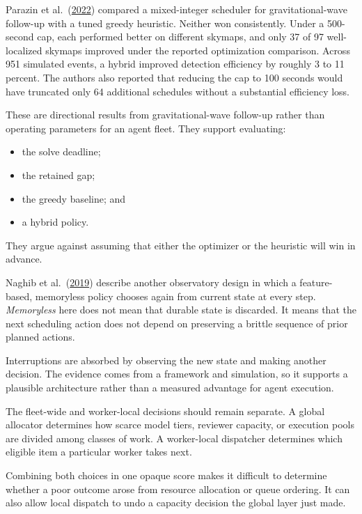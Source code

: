 Parazin et al.~(\href{https://arxiv.org/abs/2203.00013}{2022}) compared a mixed-integer scheduler for gravitational-wave follow-up with a tuned greedy heuristic. Neither won consistently. Under a 500-second cap, each performed better on different skymaps, and only 37 of 97 well-localized skymaps improved under the reported optimization comparison. Across 951 simulated events, a hybrid improved detection efficiency by roughly 3 to 11 percent. The authors also reported that reducing the cap to 100 seconds would have truncated only 64 additional schedules without a substantial efficiency loss.


These are directional results from gravitational-wave follow-up rather than operating parameters for an agent fleet. They support evaluating:

\begin{itemize}
\tightlist
\item
  the solve deadline;
\item
  the retained gap;
\item
  the greedy baseline; and
\item
  a hybrid policy.
\end{itemize}

They argue against assuming that either the optimizer or the heuristic will win in advance.

Naghib et al.~(\href{https://arxiv.org/abs/1810.04815}{2019}) describe another observatory design in which a feature-based, memoryless policy chooses again from current state at every step. \emph{Memoryless} here does not mean that durable state is discarded. It means that the next scheduling action does not depend on preserving a brittle sequence of prior planned actions.

Interruptions are absorbed by observing the new state and making another decision. The evidence comes from a framework and simulation, so it supports a plausible architecture rather than a measured advantage for agent execution.

The fleet-wide and worker-local decisions should remain separate. A global allocator determines how scarce model tiers, reviewer capacity, or execution pools are divided among classes of work. A worker-local dispatcher determines which eligible item a particular worker takes next.

Combining both choices in one opaque score makes it difficult to determine whether a poor outcome arose from resource allocation or queue ordering. It can also allow local dispatch to undo a capacity decision the global layer just made.

